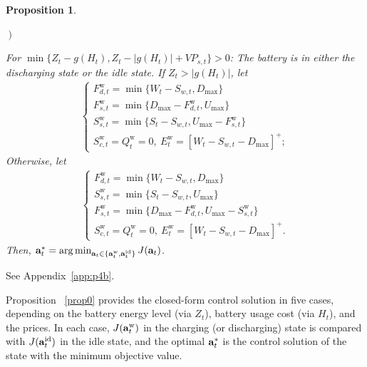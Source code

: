 \documentclass[journal]{IEEEtran}
\def\abf{{\bf a}}
\def\w{\textrm{w}}
\newtheorem{proposition}{Proposition}
\begin{document}
\begin{proposition}
\begin{list}{{\it {}$\left.\right)$~}}
\item{\it For $\min\{Z_t-g(H_t),Z_t-|g(H_t)|+VP_{s,t}\}>0$}: The battery is in either the discharging state or the idle state. If $Z_t>|g(H_t)|$, let
  \begin{align} \label{case b 1}
      \begin{cases}
      F^\w_{d,t}=\min\{W_t-S_{w,t},D_{\max}\}\\
      F^\w_{s,t}=\min\{D_{\max}-F^\w_{d,t},U_{\max}\}\\
      S^\w_{s,t}=\min\{S_t-S_{w,t},U_{\max}-F^\w_{s,t}\} \\
      S^\w_{c,t}= Q^\w_t=0,\      E^\w_t=[W_t-S_{w,t}-D_{\max}]^+;
      \end{cases}
  \end{align}
Otherwise,
let  \begin{align} \label{case b 2}
      \begin{cases}
      F^\w_{d,t}=\min\{W_t-S_{w,t},D_{\max}\}\\
      S^\w_{s,t}=\min\{S_t-S_{w,t},U_{\max}\} \\
      F^\w_{s,t}=\min\{D_{\max}-F^\w_{d,t},U_{\max}-S^\w_{s,t}\}\\
      S^\w_{c,t}= Q^\w_t=0, \ E^\w_t=[W_t-S_{w,t}-D_{\max}]^+.
      \end{cases}
  \end{align}
Then, $\abf^*_t=\arg\min_{\abf_t\in\{\abf_t^\w,\abf_t^\textrm{id}\}} J(\abf_t)$.


\end{list}
\end{proposition}
\IEEEproof
See Appendix~\ref{app:p4b}.
\endIEEEproof

Proposition ~\ref{prop0} provides the closed-form control solution in five cases, depending on the battery energy level (via $Z_t$), battery usage cost (via $H_t$), and the prices. In each case, $J(\abf^\w_t)$ in the charging (or discharging) state is compared with $J(\abf_t^\textrm{id})$ in the idle state, and the optimal   $\abf_t^*$ is the control solution of the state with the minimum objective value.
\end{document}
